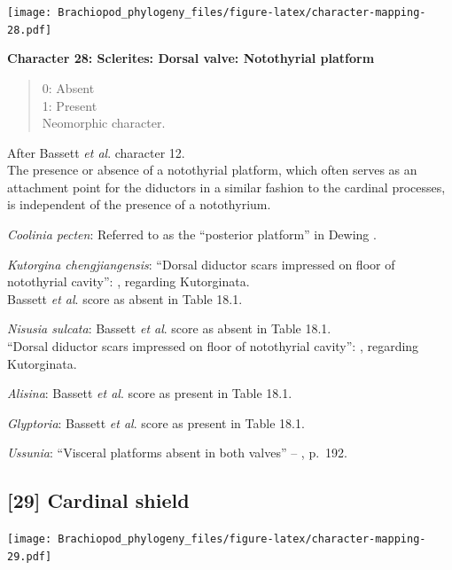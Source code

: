 \documentclass[]{book}
\theoremstyle{definition}
\theoremstyle{definition}
\theoremstyle{definition}
\theoremstyle{remark}
\begin{document}
\texttt{[image: Brachiopod\_phylogeny\_files/figure-latex/character-mapping-28.pdf]}

\textbf{Character 28: Sclerites: Dorsal valve: Notothyrial platform}

\begin{quote}
0: Absent\\
1: Present\\
Neomorphic character.
\end{quote}

After Bassett \emph{et al}.
\citeyearpar{Bassett2001Functionalmorphology} character 12.\\
The presence or absence of a notothyrial platform, which often serves as
an attachment point for the diductors in a similar fashion to the
cardinal processes, is independent of the presence of a notothyrium.

\emph{Coolinia pecten}: Referred to as the ``posterior platform'' in
Dewing \citeyearpar{Dewing2001Hingemodifications}.

\emph{Kutorgina chengjiangensis}: ``Dorsal diductor scars impressed on
floor of notothyrial cavity'':
\citet{Williams2000BrachiopodaLinguliformea}, regarding Kutorginata.\\
Bassett \emph{et al}. \citeyearpar{Bassett2001Functionalmorphology}
score as absent in Table 18.1.

\emph{Nisusia sulcata}: Bassett \emph{et al}.
\citeyearpar{Bassett2001Functionalmorphology} score as absent in Table
18.1.\\
``Dorsal diductor scars impressed on floor of notothyrial cavity'':
\citet{Williams2000BrachiopodaLinguliformea}, regarding Kutorginata.

\emph{Alisina}: Bassett \emph{et al}.
\citeyearpar{Bassett2001Functionalmorphology} score as present in Table
18.1.

\emph{Glyptoria}: Bassett \emph{et al}.
\citeyearpar{Bassett2001Functionalmorphology} score as present in Table
18.1.

\emph{Ussunia}: ``Visceral platforms absent in both valves'' --
\citet{Williams2000BrachiopodaLinguliformea}, p.~192.

\hypertarget{cardinal-shield}{%
\subsection*{{[}29{]} Cardinal shield}\label{cardinal-shield}}

\texttt{[image: Brachiopod\_phylogeny\_files/figure-latex/character-mapping-29.pdf]}
\end{document}
